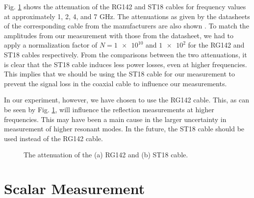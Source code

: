 \documentclass[a4paper]{report}
\numberwithin{equation}{section}
\begin{document}
Fig. \ref{fig:coax_atten} shows the attenuation of the RG142 and ST18 cables for frequency values at approximately 1, 2, 4,  and 7 $\si{\giga\hertz}$. 
The attenuations as given by the datasheets of the corresponding cable from the manufacturers are also shown \cite{st18,rg142}. To match the
amplitudes from our measurement with those from the datasheet, we had to apply a normalization factor of $N = \num{1e10}$ and $\num{1e2}$ for the 
RG142 and ST18 cables respectively. From the comparisons between the two attenuations, it is clear that the ST18 cable induces less power losses, 
even at higher frequencies. This implies that we should be using the ST18 cable for our measurement to prevent the signal loss in the coaxial
cable to influence our measurements. \par 

In our experiment, however, we have chosen to use the RG142 cable. This, as can be seen by Fig. \ref{fig:coax_atten}, will influence the reflection
measurements at higher frequencies. This may have been a main cause in the larger uncertainty in measurement of higher resonant modes. In the future,
the ST18 cable should be used instead of the RG142 cable. \par 

\begin{figure}[htb!]
	\centering
	\quad

	\caption{The attenuation of the (a) RG142 and (b) ST18 cable. }
	\label{fig:coax_atten}
\end{figure}


\section{Scalar Measurement}
\end{document}

